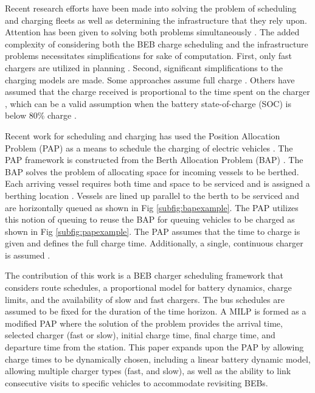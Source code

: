\documentclass[letterpaper, 10pt, conference]{IEEEtran}
\begin{document}
Recent research efforts have been made into solving the problem of scheduling and charging fleets as well as determining the infrastructure that they rely upon. Attention has been given to solving both problems simultaneously \cite{Wei2018, Sebastiani2016, Hoke2014, Wang2017}.  The added complexity of considering both the BEB charge scheduling and the infrastructure problems necessitates simplifications for sake of computation. First, only fast chargers are utilized in planning \cite{Wei2018, Sebastiani2016, Wang2017, Zhou2020, Liu2020, Yang2018, Wang2017a, Qin2016}. Second, significant simplifications to the charging models are made. Some approaches assume full charge \cite{Wei2018, Wang2017, Zhou2020, Wang2017a}. Others have assumed that the charge received is proportional to the time spent on the charger \cite{Liu2020, Yang2018}, which can be a valid assumption when the battery state-of-charge (SOC) is below 80\% charge \cite{Liu2020}.

Recent work for scheduling and charging has used the Position Allocation Problem (PAP) as a means to schedule the charging of electric vehicles \cite{Qarebagh2019}. The PAP framework is constructed from the Berth Allocation Problem (BAP) \cite{Qarebagh2019}. The BAP solves the problem of allocating space for incoming vessels to be berthed. Each arriving vessel requires both time and space to be serviced and is assigned a berthing location \cite{Imai2001}. Vessels are lined up parallel to the berth to be serviced and are horizontally queued as shown in Fig \ref{subfig:bapexample}. The PAP utilizes this notion of queuing to reuse the BAP for queuing vehicles to be charged as shown in Fig \ref{subfig:papexample}. The PAP assumes that the time to charge is given and defines the full charge time. Additionally, a single, continuous charger is assumed \cite{Qarebagh2019}.

The contribution of this work is a BEB charger scheduling framework that considers route schedules, a proportional model for battery dynamics, charge limits, and the availability of slow and fast chargers. The bus schedules are assumed to be fixed for the duration of the time horizon. A MILP is formed as a modified PAP \cite{Qarebagh2019} where the solution of the problem provides the arrival time, selected charger (fast or slow), initial charge time, final charge time, and departure time from the station. This paper expands upon the PAP by allowing charge times to be dynamically chosen, including a linear battery dynamic model, allowing multiple charger types (fast, and slow), as well as the ability to link consecutive visits to specific vehicles to accommodate revisiting BEBs.
\end{document}
